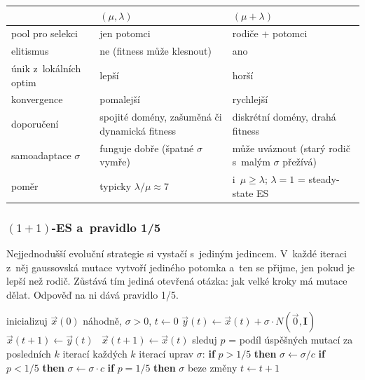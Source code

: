 \documentclass[11pt,a4paper]{article}
\theoremstyle{definition}
\begin{document}
\begin{center}
\begin{tabular}{@{}p{4cm}p{5.5cm}p{5.5cm}@{}}
\toprule
 & $(\mu,\lambda)$ & $(\mu+\lambda)$ \\
\midrule
pool pro selekci & jen potomci & rodiče + potomci \\
elitismus & ne (fitness může klesnout) & ano \\
únik z~lokálních optim & lepší & horší \\
konvergence & pomalejší & rychlejší \\
doporučení & spojité domény, zašuměná či dynamická fitness & diskrétní domény,
  drahá fitness \\
samoadaptace $\sigma$ & funguje dobře (špatné $\sigma$ vymře) & může uváznout
  (starý rodič s~malým $\sigma$ přežívá) \\
poměr & typicky $\lambda/\mu \approx 7$ & i~$\mu \ge \lambda$; $\lambda = 1$ =
  steady-state ES \\
\bottomrule
\end{tabular}
\end{center}

\subsubsection{$(1+1)$-ES a~pravidlo 1/5}

Nejjednodušší evoluční strategie si vystačí s~jediným jedincem. V~každé iteraci z~něj
gaussovská mutace vytvoří jediného potomka a~ten se přijme, jen pokud je lepší než rodič.
Zůstává tím jediná otevřená otázka: jak velké kroky má mutace dělat. Odpověď na ni dává
pravidlo 1/5.

\begin{algorithm}[!ht]
\caption{$(1+1)$-ES s~pravidlem 1/5 (minimalizace $f:\mathbb{R}^n \to \mathbb{R}$)}
\begin{algorithmic}[1]
\State inicializuj $\vec x(0)$ náhodně, $\sigma > 0$, $t \gets 0$
\Repeat
  \State $\vec y(t) \gets \vec x(t) + \sigma \cdot N(\vec 0, \mathbf{I})$
   $\vec x(t+1) \gets \vec y(t)$
  \Else\ $\vec x(t+1) \gets \vec x(t)$
  \EndIf
  \State sleduj $p$ = podíl úspěšných mutací za posledních $k$ iterací
  \State každých $k$ iterací uprav $\sigma$:
  \State \quad \textbf{if} $p > 1/5$ \textbf{then} $\sigma \gets \sigma / c$
  \State \quad \textbf{if} $p < 1/5$ \textbf{then} $\sigma \gets \sigma \cdot c$
  \State \quad \textbf{if} $p = 1/5$ \textbf{then} $\sigma$ beze změny
  \State $t \gets t+1$
\end{algorithmic}
\end{algorithm}
\end{document}
